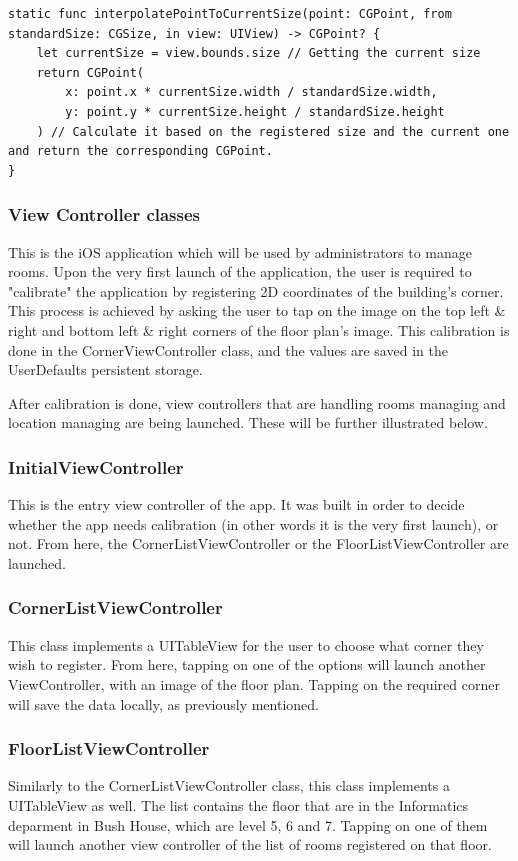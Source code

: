 \begin{lstlisting}
static func interpolatePointToCurrentSize(point: CGPoint, from standardSize: CGSize, in view: UIView) -> CGPoint? {
	let currentSize = view.bounds.size // Getting the current size
	return CGPoint(
		x: point.x * currentSize.width / standardSize.width,
		y: point.y * currentSize.height / standardSize.height
	) // Calculate it based on the registered size and the current one and return the corresponding CGPoint.
}
\end{lstlisting}

\subsubsection{View Controller classes}
This is the iOS application which will be used by administrators to manage rooms. Upon the very first launch of the application, the user is required to "calibrate" the application by registering 2D coordinates of the building's corner. This process is achieved by asking the user to tap on the image on the top left \& right and bottom left \& right corners of the floor plan's image. This calibration is done in the CornerViewController class, and the values are saved in the UserDefaults persistent storage. 

After calibration is done, view controllers that are handling rooms managing and location managing are being launched. These will be further illustrated below.

\subsubsection*{InitialViewController}
This is the entry view controller of the app. It was built in order to decide whether the app needs calibration (in other words it is the very first launch), or not. From here, the CornerListViewController or the FloorListViewController are launched.

\subsubsection*{CornerListViewController}
This class implements a UITableView for the user to choose what corner they wish to register. From here, tapping on one of the options will launch another ViewController, with an image of the floor plan. Tapping on the required corner will save the data locally, as previously mentioned.

\subsubsection*{FloorListViewController}
Similarly to the CornerListViewController class, this class implements a UITableView as well. The list contains the floor that are in the Informatics deparment in Bush House, which are level 5, 6 and 7. Tapping on one of them will launch another view controller of the list of rooms registered on that floor.

